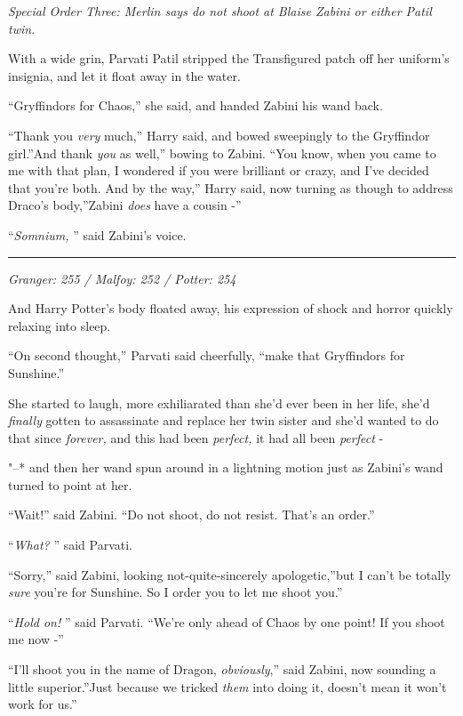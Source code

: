 \emph{Special Order Three: Merlin says do not shoot at Blaise Zabini or
either Patil twin.}

With a wide grin, Parvati Patil stripped the Transfigured patch off her
uniform's insignia, and let it float away in the water.

``Gryffindors for Chaos,'' she said, and handed Zabini his wand back.

``Thank you \emph{very} much,'' Harry said, and bowed sweepingly to the
Gryffindor girl.''And thank \emph{you} as well,'' bowing to Zabini.
``You know, when you came to me with that plan, I wondered if you were
brilliant or crazy, and I've decided that you're both. And by the way,''
Harry said, now turning as though to address Draco's body,''Zabini
\emph{does} have a cousin -''

``\emph{Somnium,} '' said Zabini's voice.

\begin{center}\rule{3in}{0.4pt}\end{center}

\emph{Granger: 255 / Malfoy: 252 / Potter: 254}

And Harry Potter's body floated away, his expression of shock and horror
quickly relaxing into sleep.

``On second thought,'' Parvati said cheerfully, ``make that Gryffindors
for Sunshine.''

She started to laugh, more exhiliarated than she'd ever been in her
life, she'd \emph{finally} gotten to assassinate and replace her twin
sister and she'd wanted to do that since \emph{forever,} and this had
been \emph{perfect,} it had all been \emph{perfect} -

"--* and then her wand spun around in a lightning motion just as Zabini's
wand turned to point at her.

``Wait!'' said Zabini. ``Do not shoot, do not resist. That's an order.''

``\emph{What?} '' said Parvati.

``Sorry,'' said Zabini, looking not-quite-sincerely apologetic,''but I
can't be totally \emph{sure} you're for Sunshine. So I order you to let
me shoot you.''

``\emph{Hold on!} '' said Parvati. ``We're only ahead of Chaos by one
point! If you shoot me now -''

``I'll shoot you in the name of Dragon, \emph{obviously},'' said Zabini,
now sounding a little superior.''Just because we tricked \emph{them}
into doing it, doesn't mean it won't work for us.''

